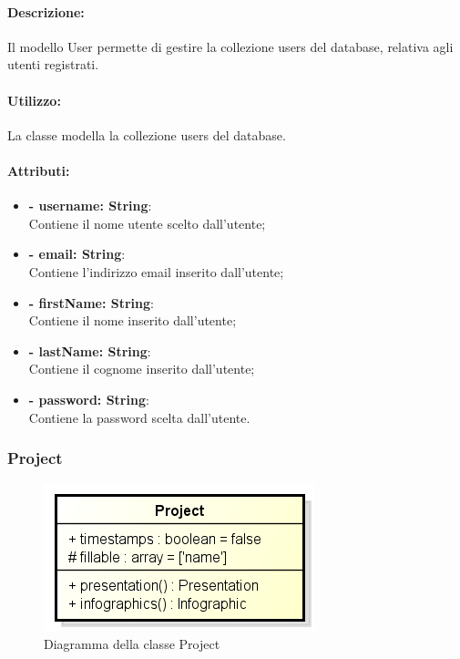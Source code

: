 	\paragraph{Descrizione:}
	Il modello User permette di gestire la collezione users del \gls{database}, relativa agli utenti registrati.
	
	\paragraph{Utilizzo:}
	La classe modella la collezione users del \gls{database}.
	
	\paragraph{Attributi:}
		\begin{itemize}
			\item \textbf{- username: String}:\\
				Contiene il nome utente scelto dall'utente;
			\item \textbf{- email: String}:\\
				Contiene l'indirizzo email inserito dall'utente;
			\item \textbf{- firstName: String}:\\
				Contiene il nome inserito dall'utente;
			\item \textbf{- lastName: String}:\\
				Contiene il cognome inserito dall'utente;
			\item \textbf{- password: String}:\\
				Contiene la password scelta dall'utente.
		\end{itemize}


\newpage


\subsubsection{Project}

	\begin{figure}[h]
		\centering
		\includegraphics[width=0.4\linewidth]{img/back_end_premi_model_project}
		\caption[Diagramma della classe Project]{Diagramma della classe Project}
		\label{fig:back_end_premi_model_project}
	\end{figure}
	
